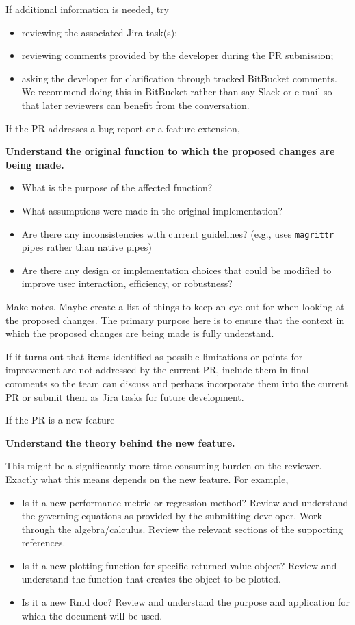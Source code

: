 \documentclass[
]{book}
\providecommand{\tightlist}{%
  \setlength{\itemsep}{0pt}\setlength{\parskip}{0pt}}
\begin{document}
If additional information is needed, try

\begin{itemize}
\tightlist
\item
  reviewing the associated Jira task(s);
\item
  reviewing comments provided by the developer during the PR submission;
\item
  asking the developer for clarification through tracked BitBucket comments. We recommend doing this in BitBucket rather than say Slack or e-mail so that later reviewers can benefit from the conversation.
\end{itemize}

If the PR addresses a bug report or a feature extension,

\textbf{Understand the original function to which the proposed changes are being made.}

\begin{itemize}
\tightlist
\item
  What is the purpose of the affected function?
\item
  What assumptions were made in the original implementation?
\item
  Are there any inconsistencies with current guidelines? (e.g., uses \texttt{magrittr} pipes rather than native pipes)
\item
  Are there any design or implementation choices that could be modified to improve user interaction, efficiency, or robustness?
\end{itemize}

Make notes. Maybe create a list of things to keep an eye out for when looking at the proposed changes. The primary purpose here is to ensure that the context in which the proposed changes are being made is fully understand.

If it turns out that items identified as possible limitations or points for improvement are not addressed by the current PR, include them in final comments so the team can discuss and perhaps incorporate them into the current PR or submit them as Jira tasks for future development.

If the PR is a new feature

\textbf{Understand the theory behind the new feature.}

This might be a significantly more time-consuming burden on the reviewer. Exactly what this means depends on the new feature. For example,

\begin{itemize}
\tightlist
\item
  Is it a new performance metric or regression method? Review and understand the governing equations as provided by the submitting developer. Work through the algebra/calculus. Review the relevant sections of the supporting references.
\item
  Is it a new plotting function for specific returned value object? Review and understand the function that creates the object to be plotted.
\item
  Is it a new Rmd doc? Review and understand the purpose and application for which the document will be used.
\end{itemize}
\end{document}
